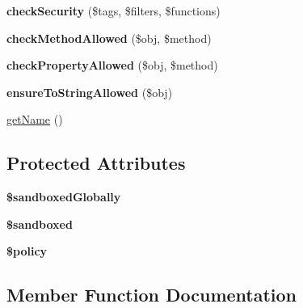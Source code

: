 \begin{DoxyCompactItemize}
\item 
\hypertarget{class_twig___extension___sandbox_a0cc084f6abef1e1ba223ddd057ddcd2b}{}{\bfseries check\+Security} (\$tags, \$filters, \$functions)\label{class_twig___extension___sandbox_a0cc084f6abef1e1ba223ddd057ddcd2b}

\item 
\hypertarget{class_twig___extension___sandbox_a90633d7d23e0b157387b886a8ef87a36}{}{\bfseries check\+Method\+Allowed} (\$obj, \$method)\label{class_twig___extension___sandbox_a90633d7d23e0b157387b886a8ef87a36}

\item 
\hypertarget{class_twig___extension___sandbox_a7dda78b41e8686064b990bb425d24700}{}{\bfseries check\+Property\+Allowed} (\$obj, \$method)\label{class_twig___extension___sandbox_a7dda78b41e8686064b990bb425d24700}

\item 
\hypertarget{class_twig___extension___sandbox_a89a0595de0cbdb8c7fce0816f25a938d}{}{\bfseries ensure\+To\+String\+Allowed} (\$obj)\label{class_twig___extension___sandbox_a89a0595de0cbdb8c7fce0816f25a938d}

\item 
\hyperlink{class_twig___extension___sandbox_a3d0963e68bb313b163a73f2803c64600}{get\+Name} ()
\end{DoxyCompactItemize}
\subsection*{Protected Attributes}
\begin{DoxyCompactItemize}
\item 
\hypertarget{class_twig___extension___sandbox_a3c007b2ec54d8bc03c6f322cb06c967b}{}{\bfseries \$sandboxed\+Globally}\label{class_twig___extension___sandbox_a3c007b2ec54d8bc03c6f322cb06c967b}

\item 
\hypertarget{class_twig___extension___sandbox_adb14098e4a3a2a64bfa016a599c63537}{}{\bfseries \$sandboxed}\label{class_twig___extension___sandbox_adb14098e4a3a2a64bfa016a599c63537}

\item 
\hypertarget{class_twig___extension___sandbox_aba8290ad8609771225e1a7e2140f6355}{}{\bfseries \$policy}\label{class_twig___extension___sandbox_aba8290ad8609771225e1a7e2140f6355}

\end{DoxyCompactItemize}


\subsection{Member Function Documentation}
\hypertarget{class_twig___extension___sandbox_a3d0963e68bb313b163a73f2803c64600}{}
